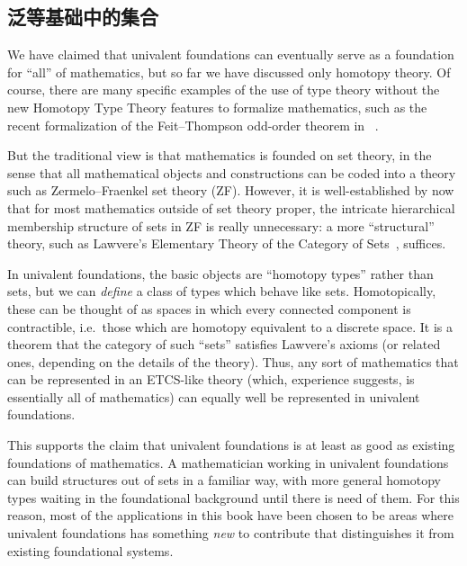 \subsection*{泛等基础中的集合}

%

We have claimed that univalent foundations can eventually serve as a foundation for ``all'' of mathematics, but so far we have discussed 
only homotopy theory.  Of course, there are many specific examples of the use of type theory without the new Homotopy Type Theory features to formalize mathematics,
%
%
%
%
%
such as the recent formalization of the Feit--Thompson odd-order theorem in \Coq~\cite{gonthier}.

But the traditional view is that mathematics is founded on set theory, in the sense that all mathematical objects and constructions can be coded into a theory such as Zermelo--Fraenkel set theory (ZF).
%
%
%
%
However, it is well-established by now that for most mathematics outside of set theory proper, the intricate hierarchical membership structure of sets in ZF is really unnecessary: a more ``structural'' theory, such as Lawvere's Elementary Theory of the Category of Sets~\cite{lawvere:etcs-long}, suffices.
%

In univalent foundations, the basic objects are ``homotopy types'' rather than sets, but we can \emph{define} a class of types which behave like sets.
Homotopically, these can be thought of as spaces in which every connected component is contractible, i.e.\ those which are homotopy equivalent to a discrete space.
%
It is a theorem  that the category of such ``sets'' satisfies Lawvere's axioms (or related ones, depending on the details of the theory).
Thus, any sort of mathematics that can be represented in an ETCS-like theory (which, experience suggests, is essentially all of mathematics) can equally well be represented in univalent foundations.  

This supports the claim that univalent foundations is at least as good as existing foundations of mathematics.
A mathematician working in univalent foundations can build structures out of sets in a familiar way, with more general homotopy types waiting in the foundational background until there is need of them.
For this reason, most of the applications in this book have been chosen to be areas where univalent foundations has something \emph{new} to contribute that distinguishes it from existing foundational systems.

